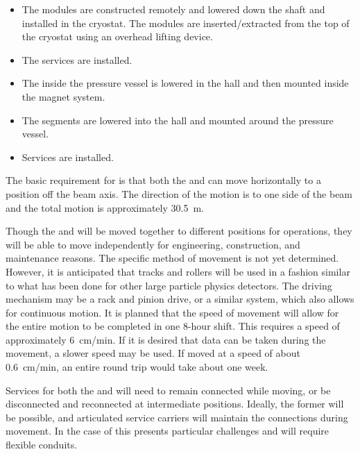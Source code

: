 \begin{itemize}
    \item The  modules are constructed remotely and lowered down the shaft and installed in the cryostat. The modules are inserted/extracted from the  top of the cryostat using an overhead lifting device. 
    \item The  services are installed.
    \item The  inside the pressure vessel is lowered in the hall and then mounted inside the magnet system. 
    \item The  segments are lowered into the hall and mounted around the pressure vessel. 
    \item  Services are installed.
\end{itemize}
The basic requirement for  is that both the  and  can move horizontally to a position off the beam axis. The direction of the motion is to one side of the beam and the total motion is approximately \SI{30.5}{\meter}. 

Though the  and  will be moved together to different positions for operations, they will be able to move independently for engineering, construction, and maintenance reasons.  The specific method of movement is not yet determined. However, it is anticipated that tracks and rollers will be used in a fashion similar to what has been done for other large particle physics detectors. The driving mechanism may be a rack and pinion drive, or a similar system, which also allows for continuous motion. 
It is planned that the speed of movement will allow for the entire motion to be completed in one 8-hour shift. This requires a speed of approximately \SI{6}{cm/min}. If it is desired that data can be taken during the movement, a slower speed may be used. If moved at a speed of about \SI{0.6}{cm/min}, an entire round trip would take about one week. 

Services for both the  and  will need to remain connected while moving, or be disconnected and reconnected at intermediate positions. Ideally, the former will be possible, and articulated service carriers will maintain the connections during movement. In the case of  this presents particular challenges and will require flexible conduits. 